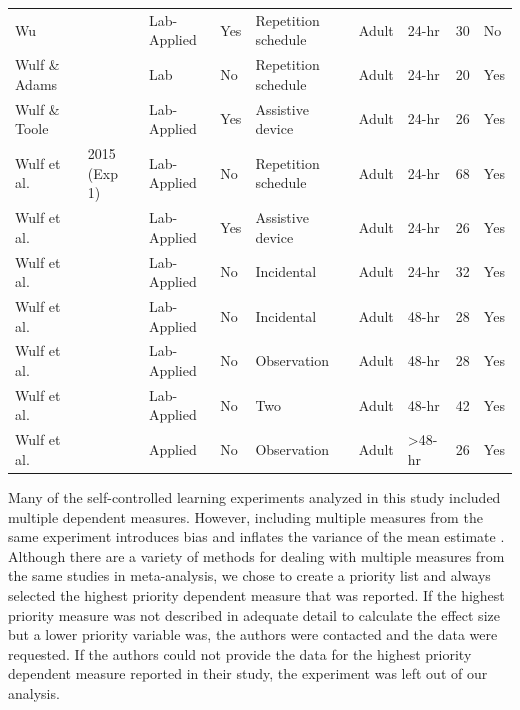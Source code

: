 \documentclass[man,floatsintext,hidelinks]{apa7}
\begin{document}
\begin{landscape}
\begin{longtable}[l]{lllllllll}
Wu                    & \citeyear[Exp 1]{wu2007self}    & Lab-Applied & Yes          & Repetition schedule   & Adult        & 24-hr              & 30  & No        \\
Wulf \& Adams         & \citeyear{Wulf2014-sn}           & Lab         & No           & Repetition schedule   & Adult        & 24-hr              & 20  & Yes       \\
Wulf \& Toole         & \citeyear{Wulf1999-pn}           & Lab-Applied & Yes          & Assistive device      & Adult        & 24-hr              & 26  & Yes       \\
Wulf et al.           & 2015 (Exp 1)    & Lab-Applied & No           & Repetition schedule   & Adult        & 24-hr              & 68  & Yes       \\
Wulf et al.           & \citeyear{Wulf2001-nb}           & Lab-Applied & Yes          & Assistive device      & Adult        & 24-hr              & 26  & Yes       \\
Wulf et al.           & \citeyear[Exp 1]{Wulf2018-ie}    & Lab-Applied & No           & Incidental            & Adult        & 24-hr              & 32  & Yes       \\
Wulf et al.           & \citeyear[Exp 2]{Wulf2018-ie}   & Lab-Applied & No           & Incidental            & Adult        & 48-hr              & 28  & Yes       \\
Wulf et al.           & \citeyear[Exp 2]{Wulf2018-ie}  & Lab-Applied & No           & Observation           & Adult        & 48-hr              & 28  & Yes       \\
Wulf et al.           & \citeyear[Exp 2]{Wulf2018-ie}   & Lab-Applied & No           & Two                   & Adult        & 48-hr              & 42  & Yes       \\
Wulf et al.           & \citeyear{Wulf2005-sz}           & Applied     & No           & Observation           & Adult        & \textgreater 48-hr & 26  & Yes       \\
\hline
\end{longtable}
\end{landscape}

\normalsize

Many of the self-controlled learning experiments analyzed in this study included multiple dependent measures. However, including multiple measures from the same experiment introduces bias and inflates the variance of the mean estimate \parencite{Scammacca2014-do}. Although there are a variety of methods for dealing with multiple measures from the same studies in meta-analysis, we chose to create a priority list and always selected the highest priority dependent measure that was reported. If the highest priority measure was not described in adequate detail to calculate the effect size but a lower priority variable was, the authors were contacted and the data were requested. If the authors could not provide the data for the highest priority dependent measure reported in their study, the experiment was left out of our analysis.
\end{document}
